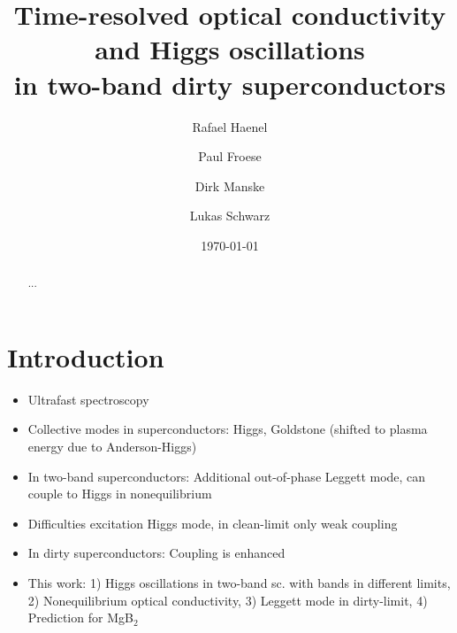 \documentclass[aps,prb,reprint,noeprint,superscriptaddress]{revtex4-2}
\begin{document}
\title{Time-resolved optical conductivity and Higgs oscillations\\in two-band dirty superconductors}

\author{Rafael Haenel}

\author{Paul Froese}


\author{Dirk Manske}

\author{Lukas Schwarz}


\date{\today}

\begin{abstract}
...
\end{abstract}




\maketitle


\section{Introduction}
\label{sec:introduction}

\begin{itemize}
	\item Ultrafast spectroscopy
	\item Collective modes in superconductors: Higgs, Goldstone (shifted to plasma energy due to Anderson-Higgs)
	\item In two-band superconductors: Additional out-of-phase Leggett mode, can couple to Higgs in nonequilibrium
	\item Difficulties excitation Higgs mode, in clean-limit only weak coupling
	\item In dirty superconductors: Coupling is enhanced
	\item This work: 1) Higgs oscillations in two-band sc. with bands in different limits, 2) Nonequilibrium optical conductivity, 3) Leggett mode in dirty-limit, 4) Prediction for MgB$_2$
\end{itemize}
\end{document}
